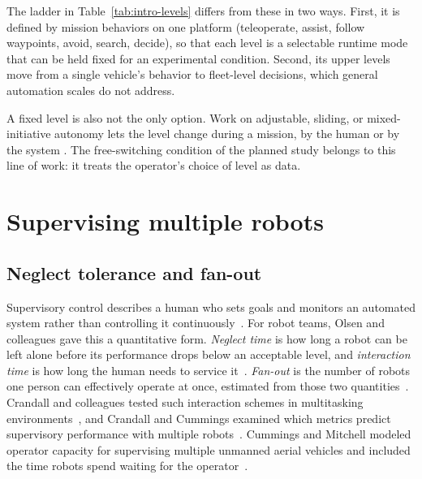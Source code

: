 The ladder in Table~\ref{tab:intro-levels} differs from these in two ways.
First, it is defined by mission behaviors on one platform (teleoperate, assist, follow waypoints, avoid, search, decide), so that each level is a selectable runtime mode that can be held fixed for an experimental condition.
Second, its upper levels move from a single vehicle's behavior to fleet-level decisions, which general automation scales do not address.

A fixed level is also not the only option.
Work on adjustable, sliding, or mixed-initiative autonomy lets the level change during a mission, by the human or by the system \citep{goodrich2001adjustable}.
The free-switching condition of the planned study belongs to this line of work: it treats the operator's choice of level as data.

\section{Supervising multiple robots}
\label{sec:bg-supervision}

\subsection{Neglect tolerance and fan-out}

Supervisory control describes a human who sets goals and monitors an automated system rather than controlling it continuously~\citep{sheridan1992telerobotics}.
For robot teams, Olsen and colleagues gave this a quantitative form.
\emph{Neglect time} is how long a robot can be left alone before its performance drops below an acceptable level, and \emph{interaction time} is how long the human needs to service it~\citep{olsen2003metrics}.
\emph{Fan-out} is the number of robots one person can effectively operate at once, estimated from those two quantities~\citep{olsen2004fanout}.
Crandall and colleagues tested such interaction schemes in multitasking environments~\citep{crandall2005validating}, and Crandall and Cummings examined which metrics predict supervisory performance with multiple robots~\citep{crandall2007predictive}.
Cummings and Mitchell modeled operator capacity for supervising multiple unmanned aerial vehicles and included the time robots spend waiting for the operator~\citep{cummings2008capacity}.

